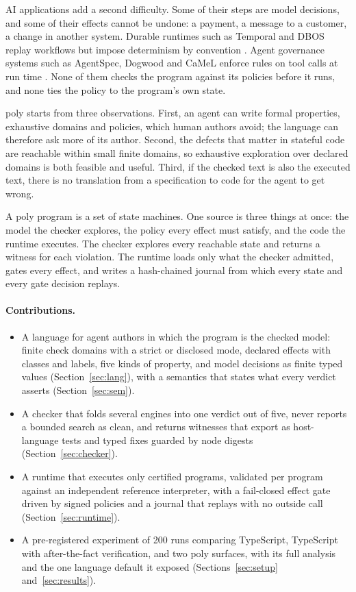 \documentclass[11pt]{article}
\newcommand{\poly}{\textsf{poly}}
\begin{document}
AI applications add a second difficulty. Some of their steps are model decisions, and some of their effects cannot be undone: a payment, a message to a customer, a change in another system. Durable runtimes such as Temporal and DBOS replay workflows but impose determinism by convention \cite{temporal,dbos}. Agent governance systems such as AgentSpec, Dogwood and CaMeL enforce rules on tool calls at run time \cite{wang2026agentspec,dogwood2026,debenedetti2025camel}. None of them checks the program against its policies before it runs, and none ties the policy to the program's own state.

\poly{} starts from three observations. First, an agent can write formal properties, exhaustive domains and policies, which human authors avoid; the language can therefore ask more of its author. Second, the defects that matter in stateful code are reachable within small finite domains, so exhaustive exploration over declared domains is both feasible and useful. Third, if the checked text is also the executed text, there is no translation from a specification to code for the agent to get wrong.

A \poly{} program is a set of state machines. One source is three things at once: the model the checker explores, the policy every effect must satisfy, and the code the runtime executes. The checker explores every reachable state and returns a witness for each violation. The runtime loads only what the checker admitted, gates every effect, and writes a hash-chained journal from which every state and every gate decision replays.

\paragraph{Contributions.}
\begin{itemize}
\item A language for agent authors in which the program is the checked model: finite check domains with a strict or disclosed mode, declared effects with classes and labels, five kinds of property, and model decisions as finite typed values (Section~\ref{sec:lang}), with a semantics that states what every verdict asserts (Section~\ref{sec:sem}).
\item A checker that folds several engines into one verdict out of five, never reports a bounded search as clean, and returns witnesses that export as host-language tests and typed fixes guarded by node digests (Section~\ref{sec:checker}).
\item A runtime that executes only certified programs, validated per program against an independent reference interpreter, with a fail-closed effect gate driven by signed policies and a journal that replays with no outside call (Section~\ref{sec:runtime}).
\item A pre-registered experiment of 200 runs comparing TypeScript, TypeScript with after-the-fact verification, and two \poly{} surfaces, with its full analysis and the one language default it exposed (Sections~\ref{sec:setup} and~\ref{sec:results}).
\end{itemize}
\end{document}
